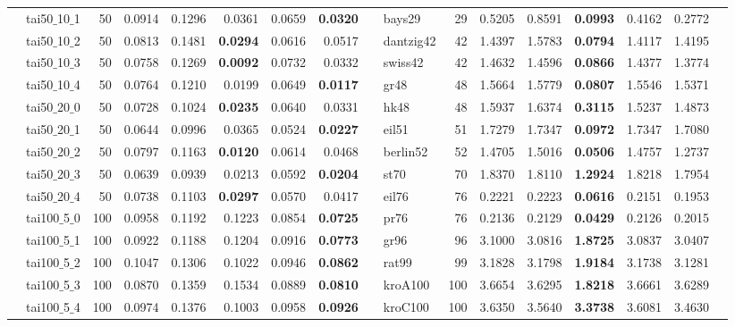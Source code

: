 \documentclass[conference]{IEEEtran}
\begin{document}
\begin{table}[hbt]
{\begin{tabular}{clrrrrrr | clrrrrrrr}
 & tai50$\_$10$\_$1 & 50 & 0.0914 & 0.1296 & 0.0361 & 0.0659 & {\bf 0.0320} &  & bays29 & 29 & 0.5205 & 0.8591 & {\bf 0.0993} & 0.4162 & 0.2772\\
 & tai50$\_$10$\_$2 & 50 & 0.0813 & 0.1481 & {\bf 0.0294} & 0.0616 & 0.0517 &  & dantzig42 & 42 & 1.4397 & 1.5783 & {\bf 0.0794} & 1.4117 & 1.4195\\
 & tai50$\_$10$\_$3 & 50 & 0.0758 & 0.1269 & {\bf 0.0092} & 0.0732 & 0.0332 &  & swiss42 & 42 & 1.4632 & 1.4596 & {\bf 0.0866} & 1.4377 & 1.3774\\
 & tai50$\_$10$\_$4 & 50 & 0.0764 & 0.1210 & 0.0199 & 0.0649 & {\bf 0.0117} &  & gr48 & 48 & 1.5664 & 1.5779 & {\bf 0.0807} & 1.5546 & 1.5371\\
 & tai50$\_$20$\_$0 & 50 & 0.0728 & 0.1024 & {\bf 0.0235} & 0.0640 & 0.0331 &  & hk48 & 48 & 1.5937 & 1.6374 & {\bf 0.3115} & 1.5237 & 1.4873\\
 & tai50$\_$20$\_$1 & 50 & 0.0644 & 0.0996 & 0.0365 & 0.0524 & {\bf 0.0227} &  & eil51 & 51 & 1.7279 & 1.7347 & {\bf 0.0972} & 1.7347 & 1.7080\\
 & tai50$\_$20$\_$2 & 50 & 0.0797 & 0.1163 & {\bf 0.0120} & 0.0614 & 0.0468 &  & berlin52 & 52 & 1.4705 & 1.5016 & {\bf 0.0506} & 1.4757 & 1.2737\\
 & tai50$\_$20$\_$3 & 50 & 0.0639 & 0.0939 & 0.0213 & 0.0592 & {\bf 0.0204} &  & st70 & 70 & 1.8370 & 1.8110 & {\bf 1.2924} & 1.8218 & 1.7954\\
 & tai50$\_$20$\_$4 & 50 & 0.0738 & 0.1103 & {\bf 0.0297} & 0.0570 & 0.0417 &  & eil76 & 76 & 0.2221 & 0.2223 & {\bf 0.0616} & 0.2151 & 0.1953\\
 & tai100$\_$5$\_$0 & 100 & 0.0958 & 0.1192 & 0.1223 & 0.0854 & {\bf 0.0725} &  & pr76 & 76 & 0.2136 & 0.2129 & {\bf 0.0429} & 0.2126 & 0.2015\\
 & tai100$\_$5$\_$1 & 100 & 0.0922 & 0.1188 & 0.1204 & 0.0916 & {\bf 0.0773} &  & gr96 & 96 & 3.1000 & 3.0816 & {\bf 1.8725} & 3.0837 & 3.0407\\
 & tai100$\_$5$\_$2 & 100 & 0.1047 & 0.1306 & 0.1022 & 0.0946 & {\bf 0.0862} &  & rat99 & 99 & 3.1828 & 3.1798 & {\bf 1.9184} & 3.1738 & 3.1281\\
 & tai100$\_$5$\_$3 & 100 & 0.0870 & 0.1359 & 0.1534 & 0.0889 & {\bf 0.0810} &  & kroA100 & 100 & 3.6654 & 3.6295 & {\bf 1.8218} & 3.6661 & 3.6289\\
 & tai100$\_$5$\_$4 & 100 & 0.0974 & 0.1376 & 0.1003 & 0.0958 & {\bf 0.0926} &  & kroC100 & 100 & 3.6350 & 3.5640 & {\bf 3.3738} & 3.6081 & 3.4630\\

\end{tabular}}
\end{table}
\end{document}
